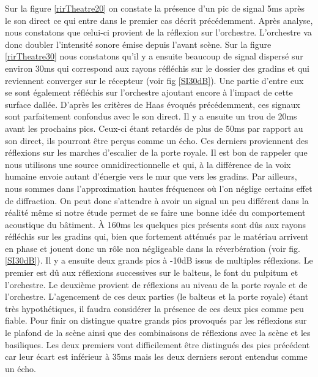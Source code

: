 Sur la figure \ref{rirTheatre20} on constate la présence d'un pic de signal 5ms après le son direct ce qui entre dans le premier cas décrit précédemment. Après analyse, nous constatons que celui-ci provient de la réflexion sur l'orchestre. L'orchestre va donc doubler l'intensité sonore émise depuis l'avant scène. Sur la figure \ref{rirTheatre30} nous constatons qu'il y a ensuite beaucoup de signal dispersé sur environ 30ms qui correspond aux rayons réfléchis sur le dossier des gradins et qui reviennent converger sur le récepteur (voir fig \ref{SI30dB}). Une partie d'entre eux se sont également réfléchis sur l'orchestre ajoutant encore à l'impact de cette surface dallée. D'après les critères de Haas évoqués précédemment, ces signaux sont parfaitement confondus avec le son direct. Il y a ensuite un trou de 20ms avant les prochains pics. Ceux-ci étant retardés de plus de 50ms par rapport au son direct, ils pourront être perçus comme un écho. Ces derniers proviennent des réflexions sur les marches d'escalier de la porte royale. Il est bon de rappeler que nous utilisons une source omnidirectionnelle et qui, à la différence de la voix humaine envoie autant d'énergie vers le mur que vers les gradins. Par ailleurs, nous sommes dans l'approximation hautes fréquences où l'on néglige certains effet de diffraction. On peut donc s'attendre à avoir un signal un peu différent dans la réalité même si notre étude permet de se faire une bonne idée du comportement acoustique du bâtiment. À 160ms les quelques pics présents sont dûs aux rayons réfléchis sur les gradins qui, bien que fortement atténués par le matériau arrivent en phase et jouent donc un rôle non négligeable dans la réverbération (voir fig. \ref{SI30dB}). Il y a ensuite deux grands pics à -10dB issus de multiples réflexions. Le premier est dû aux réflexions successives sur le \gls{balteus}, le font du \gls{pulpitum} et l'orchestre. Le deuxième provient de réflexions au niveau de la porte royale et de l'orchestre. L'agencement de ces deux parties (le \gls{balteus} et la porte royale) étant très hypothétiques, il faudra considérer la présence de ces deux pics comme peu fiable. Pour finir on distingue quatre grands pics provoqués par les réflexions sur le plafond de la scène ainsi que des combinaisons de réflexions avec la scène et les basiliques. Les deux premiers vont difficilement être distingués des pics précédent car leur écart est inférieur à 35ms mais les deux derniers seront entendus comme un écho.
%
